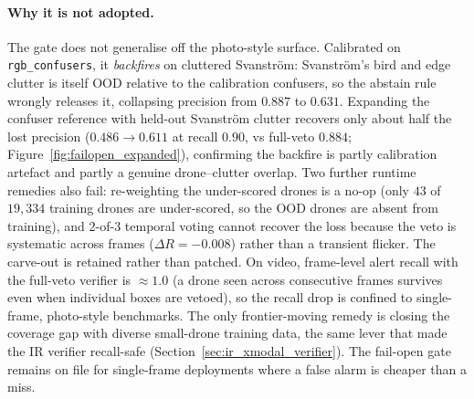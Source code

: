 \paragraph{Why it is not adopted.}
The gate does not generalise off the photo-style surface. Calibrated on \texttt{rgb\_confusers}, it \emph{backfires} on cluttered Svanstr\"om: Svanstr\"om's bird and edge clutter is itself OOD relative to the calibration confusers, so the abstain rule wrongly releases it, collapsing precision from $0.887$ to $0.631$.
Expanding the confuser reference with held-out Svanstr\"om clutter recovers only about half the lost precision ($0.486 \to 0.611$ at recall $0.90$, vs full-veto $0.884$; Figure~\ref{fig:failopen_expanded}), confirming the backfire is partly calibration artefact and partly a genuine drone--clutter overlap.
Two further runtime remedies also fail: re-weighting the under-scored drones is a no-op (only $43$ of $19{,}334$ training drones are under-scored, so the OOD drones are absent from training), and $2$-of-$3$ temporal voting cannot recover the loss because the veto is systematic across frames ($\Delta R = -0.008$) rather than a transient flicker.
The carve-out is retained rather than patched. On video, frame-level alert recall with the full-veto verifier is ${\approx}1.0$ (a drone seen across consecutive frames survives even when individual boxes are vetoed), so the recall drop is confined to single-frame, photo-style benchmarks. The only frontier-moving remedy is closing the coverage gap with diverse small-drone training data, the same lever that made the IR verifier recall-safe (Section~\ref{sec:ir_xmodal_verifier}). The fail-open gate remains on file for single-frame deployments where a false alarm is cheaper than a miss.

